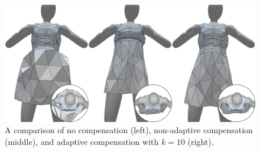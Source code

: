 \documentclass[10pt,journal,compsoc,twoside]{TexInputs/IEEEtran}
\begin{document}
\begin{figure}[t]
  \centering
  \includegraphics[width=1.0\columnwidth]{subelement_compression/no_full_adaptive_compression}
  \caption{A comparison of no compensation (left), non-adaptive compensation (middle), and
  adaptive compensation with $k = 10$ (right).}
  \label{fig:no_full_adaptive}
\end{figure}

\end{document}
